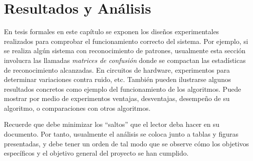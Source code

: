 \chapter{Resultados y Análisis}

En tesis formales en este capítulo se exponen los diseños experimentales
realizados para comprobar el funcionamiento correcto del sistema. Por ejemplo,
si se realiza algún sistema con reconocimiento de patrones, usualmente esta
sección involucra las llamadas \emph{matrices de confusión} donde se compactan
las estadísticas de reconocimiento alcanzadas. En circuitos de hardware,
experimentos para determinar variaciones contra ruido, etc. También pueden
ilustrarse algunos resultados concretos como ejemplo del funcionamiento de los
algoritmos. Puede mostrar por medio de experimentos ventajas, desventajas,
desempeño de su algoritmo, o comparaciones con otros algoritmos.

Recuerde que debe minimizar los ``saltos'' que el lector deba hacer en su
documento. Por tanto, usualmente el análisis se coloca junto a tablas y figuras
presentadas, y debe tener un orden de tal modo que se observe cómo los
objetivos específicos y el objetivo general del proyecto se han cumplido.
